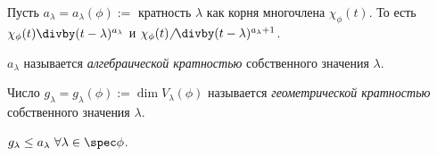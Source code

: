 Пусть $a_\lambda = a_\lambda(\phi) := $ кратность $\lambda$ как корня многочлена $\chi_\phi(t)$. То есть $\chi_\phi(t) \divby (t - \lambda)^{a_\lambda}$ и $\chi_\phi(t) \!\!\not\;\divby (t - \lambda)^{a_\lambda + 1}$.

\begin{definition}
    $a_\lambda$ называется \textit{алгебраической кратностью} собственного значения $\lambda$.
\end{definition}

\begin{definition}
    Число $g_\lambda = g_\lambda(\phi) := \dim V_\lambda(\phi)$ называется \textit{геометрической кратностью} собственного значения $\lambda$.
\end{definition}

\begin{proposal}
    $g_\lambda \leq a_\lambda \ \forall \lambda \in \spec \phi$.
\end{proposal}

